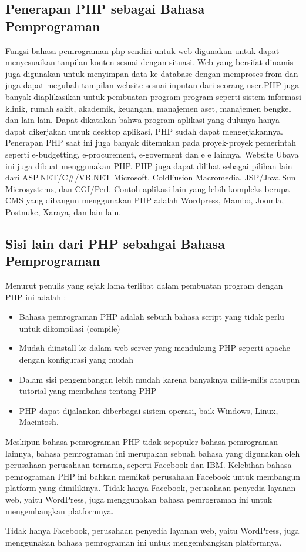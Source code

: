 \subsection{Penerapan PHP sebagai Bahasa Pemprograman}
Fungsi bahasa pemrograman php sendiri untuk web digunakan untuk dapat menyesuaikan tanpilan konten sesuai dengan situasi. Web yang bersifat dinamis juga digunakan untuk menyimpan data ke database dengan memproses from dan juga dapat megubah tampilan website sesuai inputan dari seorang user.PHP juga banyak diaplikasikan untuk pembuatan program-program seperti sistem informasi  klinik, rumah sakit, akademik, keuangan, manajemen aset, manajemen bengkel dan lain-lain. Dapat dikatakan bahwa program aplikasi yang dulunya hanya dapat dikerjakan untuk desktop aplikasi, PHP sudah dapat mengerjakannya.
Penerapan PHP saat ini juga banyak ditemukan pada proyek-proyek pemerintah seperti e-budgetting, e-procurement, e-goverment dan e e lainnya. Website Ubaya ini juga dibuat menggunakan PHP.
PHP juga dapat dilihat sebagai pilihan lain dari ASP.NET/C#/VB.NET Microsoft, ColdFusion Macromedia, JSP/Java Sun Microsystems, dan CGI/Perl. Contoh aplikasi lain yang lebih kompleks berupa CMS yang dibangun menggunakan PHP adalah Wordpress, Mambo, Joomla, Postnuke, Xaraya, dan lain-lain.

\subsection{Sisi lain dari PHP  sebahgai Bahasa Pemprograman}
Menurut penulis yang sejak lama terlibat dalam pembuatan program dengan PHP ini adalah :
  \begin{itemize}
    \item Bahasa pemrograman PHP adalah sebuah bahasa script yang tidak perlu untuk dikompilasi (compile)
    \item Mudah diinstall ke dalam web server yang mendukung PHP seperti apache dengan konfigurasi yang mudah
    \item Dalam sisi pengembangan lebih mudah karena banyaknya milis-milis ataupun tutorial yang membahas tentang PHP
    \item PHP dapat dijalankan diberbagai sistem operasi, baik Windows, Linux, Macintosh.
  \end{itemize}
Meskipun bahasa pemrograman PHP tidak sepopuler bahasa pemrograman lainnya, bahasa pemrograman ini merupakan sebuah bahasa yang digunakan oleh perusahaan-perusahaan ternama, seperti Facebook dan IBM.
Kelebihan bahasa pemrograman PHP ini bahkan memikat perusahaan Facebook untuk membangun platform yang dimilikinya. Tidak hanya Facebook, perusahaan penyedia layanan web, yaitu WordPress, juga menggunakan bahasa pemrograman ini untuk mengembangkan platformnya.

Tidak hanya Facebook, perusahaan penyedia layanan web, yaitu WordPress, juga menggunakan bahasa pemrograman ini untuk mengembangkan platformnya.




